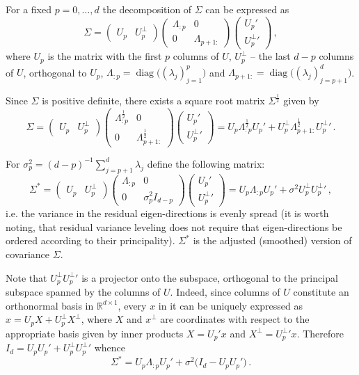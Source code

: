 \documentclass[a4paper,14pt]{article}
\newcommand{\diag}{\mathop{\text{diag}}\nolimits}
\newcommand{\Real}{\mathbb{R}}
\begin{document}
For a fixed $p=0,\ldots, d$ the decomposition of $\Sigma$ can be expressed as
$$ \Sigma
    = \begin{pmatrix}U_p & U_p^\perp\end{pmatrix}
    \begin{pmatrix}\Lambda_{:p} & 0\\0&\Lambda_{p+1:}\end{pmatrix}
    \begin{pmatrix}U_p'\\{U_p^\perp}'\end{pmatrix}\,,$$
where $U_p$ is the matrix with the first $p$ columns of $U$, $U_p^\perp$ -- the last
$d-p$ columns of $U$, orthogonal to $U_p$, $\Lambda_{:p}=\diag\bigl((\lambda_j)_{j=1}^p\bigr)$
and $\Lambda_{p+1:}=\diag\bigl((\lambda_j)_{j=p+1}^d\bigr)$.

Since $\Sigma$ is positive definite, there exists a square root matrix $\Sigma^\frac{1}{2}$
given by
$$ \Sigma
    = \begin{pmatrix}U_p & U_p^\perp\end{pmatrix}
    \begin{pmatrix}\Lambda_{:p}^\frac{1}{2} & 0\\0&\Lambda_{p+1:}^\frac{1}{2}\end{pmatrix}
    \begin{pmatrix}U_p'\\{U_p^\perp}'\end{pmatrix}
    = U_p \Lambda_{:p}^\frac{1}{2} U_p' + U_p^\perp \Lambda_{p+1:}^\frac{1}{2} {U_p^\perp}'\,.$$

For $\sigma^2_p = (d-p)^{-1}\sum_{j=p+1}^d \lambda_j$ define the following matrix:
$$ \Sigma^*
    = \begin{pmatrix}U_p & U_p^\perp\end{pmatrix}
    \begin{pmatrix}\Lambda_{:p} & 0\\0&\sigma^2_p I_{d-p}\end{pmatrix}
    \begin{pmatrix}U_p'\\{U_p^\perp}'\end{pmatrix}
    = U_p\Lambda_{:p}U_p' + \sigma^2 U_p^\perp {U_p^\perp}'\,,$$
i.e. the variance in the residual eigen-directions is evenly spread (it is worth
noting, that residual variance leveling does not require that eigen-directions be
ordered according to their principality). $\Sigma^*$ is the adjusted (smoothed)
version of covariance $\Sigma$.

Note that $U_p^\perp {U_p^\perp}'$ is a projector onto the subspace, orthogonal to
the principal subspace spanned by the columns of $U$. Indeed, since columns of $U$
constitute an orthonormal basis in $\Real^{d\times 1}$, every $x$ in it can be
uniquely expressed as $ x = U_p X + U_p^\perp X^\perp$, where $X$ and $x^\perp$ are
coordinates with respect to the appropriate basis given by inner products $X = U_p' x$
and $X^\perp = {U_p^\perp}'x$. Therefore $I_d = U_p U_p' + U_p^\perp {U_p^\perp}'$
whence 
$$ \Sigma^* = U_p\Lambda_{:p}U_p' + \sigma^2 \bigl(I_d - U_p U_p' \bigr) \,.$$
\end{document}
